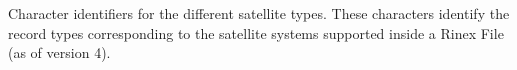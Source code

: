 \documentclass[letterpaper,10pt,english]{sphinxmanual}
\begin{document}
\begin{fulllineitems}
\label{\detokenize{modules/gps/ephemeris:qnav.gps.ephemeris.SatelliteType}}
\pysigstartsignatures
{}
\pysigstopsignatures
\sphinxAtStartPar
Character identifiers for the different satellite types.
These characters identify the record types corresponding to the satellite
systems supported inside a Rinex File (as of version 4).

\end{fulllineitems}

\end{document}
